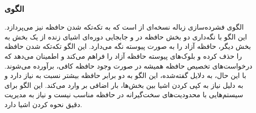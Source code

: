\subsubsection{الگوی }
\label{memGarbCompatorSec}
\begin{RTL}
الگوی فشرده‌سازی زباله نسخه‌ای از 
است که به تکه‌تکه شدن
حافظه نیز می‌پردازد. این الگو با نگه‌داری دو بخش حافظه
در  و جابجایی دوره‌ای اشیای زنده از یک بخش
به بخش دیگر، حافظه آزاد را به صورت پیوسته نگه می‌دارد.
این الگو تکه‌تکه شدن حافظه را حذف کرده و
بلوک‌های پیوسته حافظه آزاد را فراهم می‌کند و
اطمینان می‌دهد که درخواست‌های تخصیص حافظه همیشه در صورت
وجود حافظه کافی، برآورده می‌شوند. با این حال،
به دلایل گفته‌شده، این الگو به دو برابر حافظه بیشتر نسبت
به  نیاز دارد و به دلیل نیاز
به کپی کردن اشیا بین بخش‌ها، بار اضافی بر
 وارد می‌کند. این الگو برای سیستم‌هایی با
محدودیت‌های سخت‌گیرانه در حافظه مناسب نیست و نیاز
به مدیریت دقیق نحوه کردن اشیا دارد.
\end{RTL}